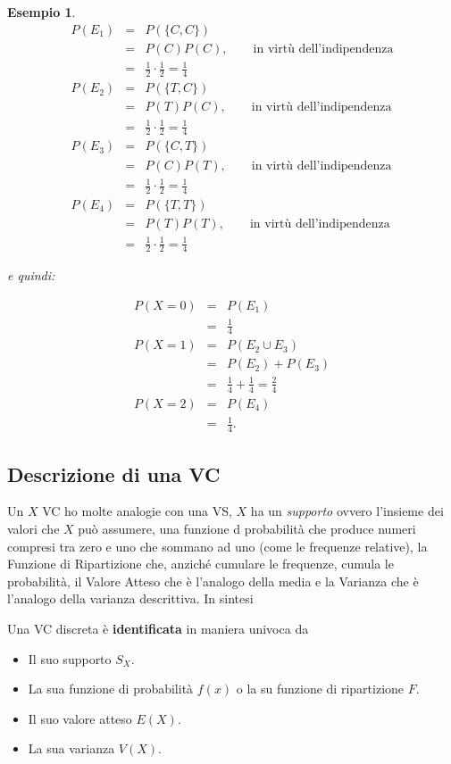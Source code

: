 \documentclass[
  11pt,
]{book}
\providecommand{\tightlist}{%
  \setlength{\itemsep}{0pt}\setlength{\parskip}{0pt}}
\theoremstyle{mytheoremstyle}
\theoremstyle{mydefstyle}
\newtheorem{example}{{Esempio}}[section]
\newenvironment{nota}
  {
\begin{tcolorbox}[enhanced,breakable,arc=0.1mm,boxrule=1pt,colback=white,colframe=iblue,title=\bf \fontfamily{lmss}\selectfont \faInfoCircle \hspace{.5 cm} Nota,drop fuzzy shadow]
}{
\end{tcolorbox}
  }
\begin{document}
\begin{example}
\begin{eqnarray*} 
P(E_1) &=& P(\{C,C\}) \\ 
    &=& P(C)P(C), \qquad \text{in virtù dell'indipendenza}\\
    &=& \frac 12 \cdot \frac 12  = \frac 14 \\
P(E_2)  &=& P(\{T,C\})\\
    &=& P(T)P(C), \qquad \text{in virtù dell'indipendenza}\\
    &=& \frac 12 \cdot \frac 12  = \frac 14 \\
P(E_3)  &=& P(\{C,T\})\\
    &=& P(C)P(T), \qquad \text{in virtù dell'indipendenza}\\
    &=& \frac 12 \cdot \frac 12  = \frac 14 \\
P(E_4)  &=& P(\{T,T\})\\
    &=& P(T)P(T), \qquad \text{in virtù dell'indipendenza}\\
    &=& \frac 12 \cdot \frac 12  = \frac 14 
\end{eqnarray*}

e quindi:

\begin{eqnarray*} 
P(X=0) &=& P(E_1) \\ 
    &=&\frac 14\\
P(X=1) &=& P(E_2\cup E_3)\\
    &=& P(E_2)+P(E_3)\\
    &=& \frac 14+\frac 14 = \frac 24\\
P(X=2) &=& P(E_4) \\ 
    &=&\frac 14.
\end{eqnarray*}
\end{example}

\subsection{Descrizione di una VC}\label{descrizione-di-una-vc}

Un \(X\) VC ho molte analogie con una VS, \(X\) ha un \emph{supporto}
ovvero l'insieme dei valori che \(X\) può assumere, una funzione d probabilità
che produce numeri compresi tra zero e uno che sommano ad uno (come le frequenze relative),
la Funzione di Ripartizione che, anziché cumulare le frequenze, cumula le probabilità,
il Valore Atteso che è l'analogo della media e la Varianza che è l'analogo della varianza
descrittiva. In sintesi

\begin{nota}

Una VC discreta è \textbf{identificata} in maniera univoca da

\begin{itemize}
\tightlist
\item
  Il suo supporto \(S_X\).
\item
  La sua funzione di probabilità \(f(x)\) o la su funzione di ripartizione \(F\).
\item
  Il suo valore atteso \(E(X)\).
\item
  La sua varianza \(V(X).\)
\end{itemize}

\end{nota}
\end{document}
